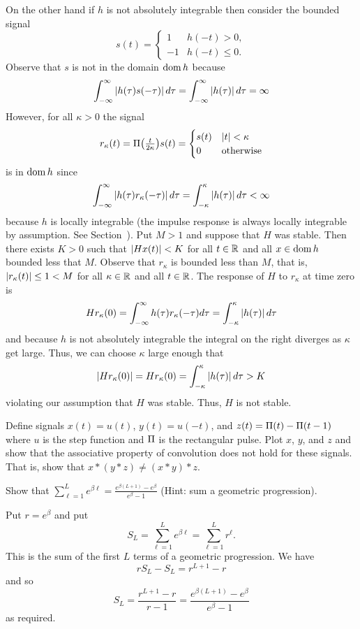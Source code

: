 \begin{excersizelist}
\begin{solution}
On the other hand if $h$ is not absolutely integrable then consider the bounded signal 
\[
s(t) = \begin{cases}
1 & h(-t) > 0,  \\
-1 & h(-t) \leq 0.
\end{cases}
\]
Observe that $s$ is not in the domain $\operatorname{dom} h$ because
\[
\int_{-\infty}^\infty \left\vert h(\tau)  s(-\tau) \right\vert d\tau = \int_{-\infty}^\infty \left\vert h(\tau) \right\vert d\tau = \infty
\]
However, for all $\kappa > 0$ the signal 
\[
r_\kappa(t) = \Pi\big(\tfrac{t}{2\kappa}\big) s(t) = 
\begin{cases}
s(t) & \left\vert t \right\vert < \kappa \\
0 & \text{otherwise}
\end{cases}
\]
is in $\operatorname{dom} h$ since
\[
\int_{-\infty}^\infty \left\vert h(\tau)  r_\kappa(-\tau) \right\vert d\tau = \int_{-\kappa}^\kappa \left\vert h(\tau) \right\vert d\tau < \infty
\]
because $h$ is locally integrable (the impulse response is always locally integrable by assumption.  See Section~).  Put $M > 1$ and suppose that $H$ was stable.  Then there exists $K > 0$ such that $\left\vert H x(t) \right\vert < K$ for all $t \in {\mathbb R}$ and all $x \in \operatorname{dom} h$ bounded less that $M$.  Observe that $r_\kappa$ is bounded less than $M$, that is, $\left\vert r_\kappa(t) \right\vert \leq 1 < M$ for all $\kappa \in {\mathbb R}$ and all $t \in {\mathbb R}$.  The response of $H$ to $r_\kappa$ at time zero is
\[
H r_\kappa(0) = \int_{-\infty}^\infty h(\tau)  r_\kappa(-\tau) d\tau =  \int_{-\kappa}^\kappa \left\vert h(\tau) \right\vert d\tau
\]
and because $h$ is not absolutely integrable the integral on the right diverges as $\kappa$ get large.  Thus, we can choose $\kappa$ large enough that
\[
\left\vert H r_\kappa(0) \right\vert = H r_\kappa(0) = \int_{-\kappa}^\kappa \left\vert h(\tau) \right\vert d\tau > K
\]
violating our assumption that $H$ was stable.  Thus, $H$ is not stable.
\end{solution}

\item Define signals $x(t) = u(t)$, $y(t) = u(-t)$, and $z(t) = \Pi(t) - \Pi(t-1)$ where $u$ is the step function and $\Pi$ is the rectangular pulse.  Plot $x$, $y$, and $z$ and show that the associative property of convolution does not hold for these signals.  That is, show that $x*(y*z) \neq (x*y)*z$.

\item \label{excer:sumgeomeebeta} Show that $\sum_{\ell = 1}^L e^{\beta \ell} = \frac{e^{\beta (L+1)} - e^\beta}{e^\beta - 1}$  (Hint: sum a geometric progression).
\begin{solution}
Put $r = e^\beta$ and put
\[
S_L = \sum_{\ell = 1}^L e^{\beta \ell} = \sum_{\ell = 1}^L r^\ell.
\]
This is the sum of the first $L$ terms of a geometric progression.  We have
\[
r S_L - S_L = r^{L+1} - r
\]
and so
\[
S_L = \frac{r^{L+1} - r}{r - 1} =  \frac{e^{\beta (L+1)} - e^\beta}{e^\beta - 1}
\]
as required.
\end{solution}


\end{excersizelist}

